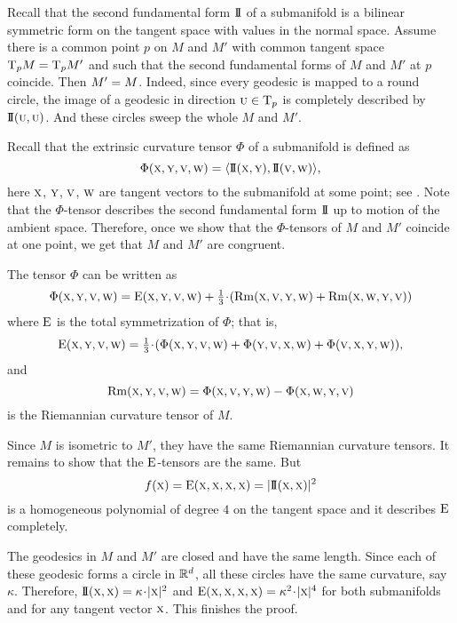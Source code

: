 \documentclass[a4paper,10pt]{article}
\begin{document}
Recall that the second fundamental form $\mathrm{I}\!\mathrm{I}$ of a submanifold is a bilinear symmetric form on the tangent space with values in the normal space.
Assume there is a common point $p$ on $M$ and $M'$ 
with common tangent space $\T_pM\z=\T_pM'$ and such that the second fundamental forms of $M$ and $M'$ at $p$ coincide.
Then $M'\z=M$.
Indeed, since every geodesic is mapped to a round circle, the image of a geodesic in direction ${{\normalfont\textsc{u}}}\in \mathrm{T}_p$ is completely described by $\mathrm{I}\!\mathrm{I}({{\normalfont\textsc{u}}},{{\normalfont\textsc{u}}})$.
And these circles sweep the whole $M$ and $M'$.

Recall that the extrinsic curvature tensor $\Phi$ of a submanifold is defined as
\[\Phi({{\normalfont\textsc{x}}},{{\normalfont\textsc{y}}},{{\normalfont\textsc{v}}},{{\normalfont\textsc{w}}})=\langle \mathrm{I}\!\mathrm{I}({{\normalfont\textsc{x}}},{{\normalfont\textsc{y}}}),\mathrm{I}\!\mathrm{I}({{\normalfont\textsc{v}}},{{\normalfont\textsc{w}}})\rangle,\]
here ${\normalfont\textsc{x}}$, ${\normalfont\textsc{y}}$, ${\normalfont\textsc{v}}$, ${\normalfont\textsc{w}}$ are tangent vectors to the submanifold at some point; 
see \cite{petrunin2003}.
Note that the $\Phi$-tensor describes the second fundamental form $\mathrm{I}\!\mathrm{I}$ up to motion of the ambient space.
Therefore, once we show that the $\Phi$-tensors of $M$ and $M'$ coincide at one point,
we get that $M$ and $M'$ are congruent.

The tensor $\Phi$ can be written as
\[\Phi({\mathsc{x}},{\mathsc{y}},{\mathsc{v}},{\mathsc{w}})
=
\E({\mathsc{x}},{\mathsc{y}},{\mathsc{v}},{\mathsc{w}})+\tfrac 1 3\cdot(\Rm({\mathsc{x}},{\mathsc{v}},{\mathsc{y}},{\mathsc{w}})+\Rm({\mathsc{x}},{\mathsc{w}},{\mathsc{y}},{\mathsc{v}}))\]
where $\mathrm{E}$ is the total symmetrization of $\Phi$; that is,
$$\E({\mathsc{x}},{\mathsc{y}},{\mathsc{v}},{\mathsc{w}})=\tfrac 1 3\cdot
(\Phi({\mathsc{x}},{\mathsc{y}},{\mathsc{v}},{\mathsc{w}})+\Phi({\mathsc{y}},{\mathsc{v}},{\mathsc{x}},{\mathsc{w}})+\Phi({\mathsc{v}},{\mathsc{x}},{\mathsc{y}},{\mathsc{w}})),$$
and
$$\operatorname{\rm Rm}({{\normalfont\textsc{x}}},{{\normalfont\textsc{y}}},{{\normalfont\textsc{v}}},{{\normalfont\textsc{w}}})=\Phi({{\normalfont\textsc{x}}},{{\normalfont\textsc{v}}},{{\normalfont\textsc{y}}},{{\normalfont\textsc{w}}})-\Phi({{\normalfont\textsc{x}}},{{\normalfont\textsc{w}}},{{\normalfont\textsc{y}}},{{\normalfont\textsc{v}}})$$
is the Riemannian curvature tensor of $M$.

Since $M$ is isometric to $M'$, they have the same Riemannian curvature tensors.
It remains to show that the $\mathrm{E}$-tensors are the same.
But 
\[f({\mathsc{x}})=\E({\mathsc{x}},{\mathsc{x}},{\mathsc{x}},{\mathsc{x}})\z=|\II({\mathsc{x}},{\mathsc{x}})|^2\]
is a homogeneous polynomial of degree $4$ on the tangent space 
and it describes $\mathrm{E}$ completely.

The geodesics in $M$ and $M'$ are closed and have the same length.
Since each of these geodesic forms a circle in $\mathbb{R}^d$,
all these circles have the same curvature, say $\kappa$.
Therefore, $\II({\mathsc{x}},{\mathsc{x}})\z=\kappa\cdot|{\mathsc{x}}|^2$ and $\E({\mathsc{x}},{\mathsc{x}},{\mathsc{x}},{\mathsc{x}})=\kappa^2\cdot|{\mathsc{x}}|^4$ 
for both submanifolds and for any tangent vector ${{\normalfont\textsc{x}}}$.
This finishes the proof.
\qeds
\end{document}
